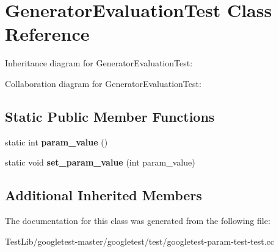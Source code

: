 \hypertarget{classGeneratorEvaluationTest}{}\section{Generator\+Evaluation\+Test Class Reference}
\label{classGeneratorEvaluationTest}


Inheritance diagram for Generator\+Evaluation\+Test\+:


Collaboration diagram for Generator\+Evaluation\+Test\+:
\subsection*{Static Public Member Functions}
\begin{DoxyCompactItemize}
\item 
\mbox{\label{classGeneratorEvaluationTest_ac819769e32b738677401424deb3c8cbe}} 
static int {\bfseries param\+\_\+value} ()
\item 
\mbox{\label{classGeneratorEvaluationTest_ae4f5fb96577dd680d9fa1fd6c3c4af46}} 
static void {\bfseries set\+\_\+param\+\_\+value} (int param\+\_\+value)
\end{DoxyCompactItemize}
\subsection*{Additional Inherited Members}


The documentation for this class was generated from the following file\+:\begin{DoxyCompactItemize}
\item 
Test\+Lib/googletest-\/master/googletest/test/googletest-\/param-\/test-\/test.\+cc\end{DoxyCompactItemize}
